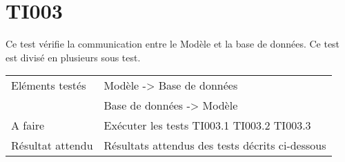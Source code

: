 
\section{TI003}
	Ce test vérifie la communication entre le Modèle et la base de données. Ce test est divisé en plusieurs sous test.
	\begin{center}
     	\begin{tabular}[h]{|p{}|p{}|}
		\hline
			Eléments testés & Modèle -> Base de données  \\
						    &  Base de données -> Modèle \\\hline
    			A faire & Exécuter les tests TI003.1 TI003.2 TI003.3 \\\hline
    			Résultat attendu & Résultats attendus des tests décrits ci-dessous \\\hline
     	\end{tabular}
  	\end{center}	
  	
  	




 	